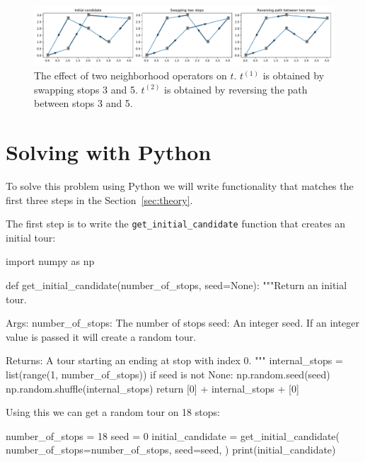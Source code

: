 \begin{figure}[!hbtp]
    \begin{center}
        \includegraphics[width=\textwidth]{./assets/tsp-effect-of-neighbourhood-operators/main.pdf}
    \end{center}
    \caption{The effect of two neighborhood operators on \(t\). \(t^{(1)}\) is
    obtained by swapping stops 3 and 5. \(t^{(2)}\) is obtained by reversing the
    path between stops 3 and 5.}
    \label{fig:tsp}
\end{figure}

\section{Solving with Python}\label{sec:solving-with-python}

To solve this problem using Python we will write functionality that matches the
first three steps in the Section~\ref{sec:theory}.

The first step is to write the \texttt{get_initial_candidate}
function that creates an initial tour:

\begin{pyin}
import numpy as np


def get_initial_candidate(number_of_stops, seed=None):
    """Return an initial tour.

    Args:
        number_of_stops: The number of stops
        seed: An integer seed. If an integer value is
              passed it will create a random tour.

    Returns:
        A tour starting an ending at stop with index 0.
    """
    internal_stops = list(range(1, number_of_stops))
    if seed is not None:
        np.random.seed(seed)
        np.random.shuffle(internal_stops)
    return [0] + internal_stops + [0]
\end{pyin}

Using this we can get a random tour on 18 stops:

\begin{pyin}
number_of_stops = 18
seed = 0
initial_candidate = get_initial_candidate(
    number_of_stops=number_of_stops,
    seed=seed,
)
print(initial_candidate)
\end{pyin}

